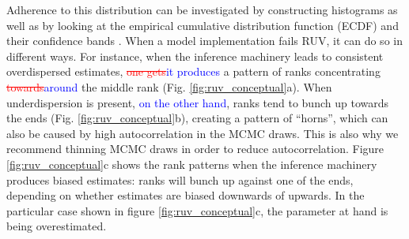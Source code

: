 \documentclass[oneside]{article}
\begin{document}
Adherence to this distribution can be investigated by constructing histograms \citep{Talts2018} as well as by looking at the empirical cumulative distribution function (ECDF) and their confidence bands \citep{Sailynoja2021}.
When a model implementation fails RUV, it can do so in different ways.
For instance, when the inference machinery leads to consistent overdispersed estimates, \textcolor{red}{\st{one gets}}\textcolor{blue}{it produces} a pattern of ranks concentrating \textcolor{red}{\st{towards}}\textcolor{blue}{around} the middle rank (Fig. \ref{fig:ruv_conceptual}a).
When underdispersion is present, \textcolor{blue}{on the other hand}, ranks tend to bunch up towards the ends (Fig. \ref{fig:ruv_conceptual}b), creating a pattern of ``horns'', which can also be caused by high autocorrelation in the MCMC draws.
This is also why we recommend thinning MCMC draws in order to reduce autocorrelation.
Figure \ref{fig:ruv_conceptual}c shows the rank patterns when the inference machinery produces biased estimates: ranks will bunch up against one of the ends, depending on whether estimates are biased downwards of upwards.
In the particular case shown in figure \ref{fig:ruv_conceptual}c, the parameter at hand is being overestimated.
\end{document}
